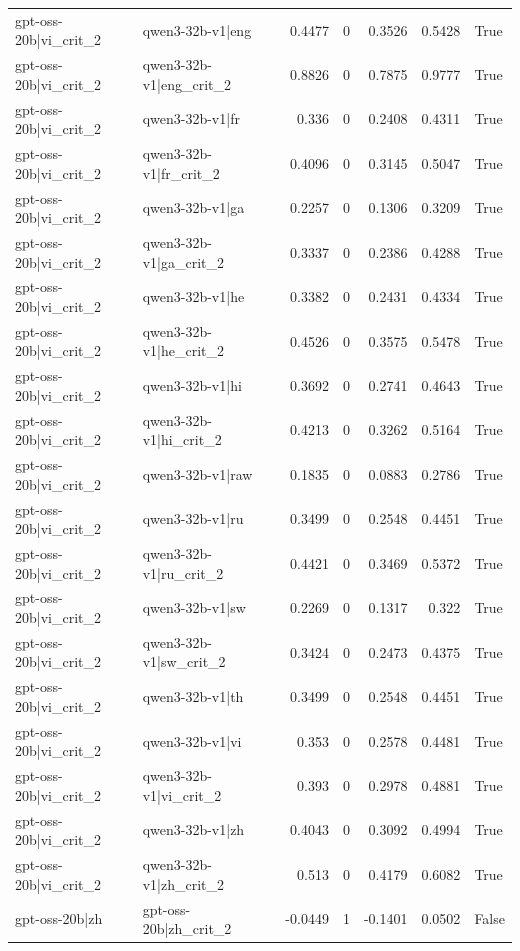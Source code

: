 \begin{table}
\begin{tabular}{l l r r r r l}
gpt-oss-20b|vi_crit_2 & qwen3-32b-v1|eng & 0.4477 & 0 & 0.3526 & 0.5428 & True \\
gpt-oss-20b|vi_crit_2 & qwen3-32b-v1|eng_crit_2 & 0.8826 & 0 & 0.7875 & 0.9777 & True \\
gpt-oss-20b|vi_crit_2 & qwen3-32b-v1|fr & 0.336 & 0 & 0.2408 & 0.4311 & True \\
gpt-oss-20b|vi_crit_2 & qwen3-32b-v1|fr_crit_2 & 0.4096 & 0 & 0.3145 & 0.5047 & True \\
gpt-oss-20b|vi_crit_2 & qwen3-32b-v1|ga & 0.2257 & 0 & 0.1306 & 0.3209 & True \\
gpt-oss-20b|vi_crit_2 & qwen3-32b-v1|ga_crit_2 & 0.3337 & 0 & 0.2386 & 0.4288 & True \\
gpt-oss-20b|vi_crit_2 & qwen3-32b-v1|he & 0.3382 & 0 & 0.2431 & 0.4334 & True \\
gpt-oss-20b|vi_crit_2 & qwen3-32b-v1|he_crit_2 & 0.4526 & 0 & 0.3575 & 0.5478 & True \\
gpt-oss-20b|vi_crit_2 & qwen3-32b-v1|hi & 0.3692 & 0 & 0.2741 & 0.4643 & True \\
gpt-oss-20b|vi_crit_2 & qwen3-32b-v1|hi_crit_2 & 0.4213 & 0 & 0.3262 & 0.5164 & True \\
gpt-oss-20b|vi_crit_2 & qwen3-32b-v1|raw & 0.1835 & 0 & 0.0883 & 0.2786 & True \\
gpt-oss-20b|vi_crit_2 & qwen3-32b-v1|ru & 0.3499 & 0 & 0.2548 & 0.4451 & True \\
gpt-oss-20b|vi_crit_2 & qwen3-32b-v1|ru_crit_2 & 0.4421 & 0 & 0.3469 & 0.5372 & True \\
gpt-oss-20b|vi_crit_2 & qwen3-32b-v1|sw & 0.2269 & 0 & 0.1317 & 0.322 & True \\
gpt-oss-20b|vi_crit_2 & qwen3-32b-v1|sw_crit_2 & 0.3424 & 0 & 0.2473 & 0.4375 & True \\
gpt-oss-20b|vi_crit_2 & qwen3-32b-v1|th & 0.3499 & 0 & 0.2548 & 0.4451 & True \\
gpt-oss-20b|vi_crit_2 & qwen3-32b-v1|vi & 0.353 & 0 & 0.2578 & 0.4481 & True \\
gpt-oss-20b|vi_crit_2 & qwen3-32b-v1|vi_crit_2 & 0.393 & 0 & 0.2978 & 0.4881 & True \\
gpt-oss-20b|vi_crit_2 & qwen3-32b-v1|zh & 0.4043 & 0 & 0.3092 & 0.4994 & True \\
gpt-oss-20b|vi_crit_2 & qwen3-32b-v1|zh_crit_2 & 0.513 & 0 & 0.4179 & 0.6082 & True \\
gpt-oss-20b|zh & gpt-oss-20b|zh_crit_2 & -0.0449 & 1 & -0.1401 & 0.0502 & False \\

\end{tabular}
\end{table}
